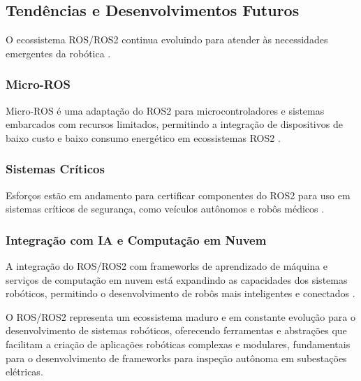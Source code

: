 \subsection{Tendências e Desenvolvimentos Futuros}

O ecossistema ROS/ROS2 continua evoluindo para atender às necessidades emergentes da robótica \cite{Macenski2022, ROS2Design2024}.

\subsubsection{Micro-ROS}

Micro-ROS é uma adaptação do ROS2 para microcontroladores e sistemas embarcados com recursos limitados, permitindo a integração de dispositivos de baixo custo e baixo consumo energético em ecossistemas ROS2 \cite{Macenski2022}.

\subsubsection{Sistemas Críticos}

Esforços estão em andamento para certificar componentes do ROS2 para uso em sistemas críticos de segurança, como veículos autônomos e robôs médicos \cite{Macenski2022, ROS2Design2024}.

\subsubsection{Integração com IA e Computação em Nuvem}

A integração do ROS/ROS2 com frameworks de aprendizado de máquina e serviços de computação em nuvem está expandindo as capacidades dos sistemas robóticos, permitindo o desenvolvimento de robôs mais inteligentes e conectados \cite{Macenski2022, ROS2Design2024}.

O ROS/ROS2 representa um ecossistema maduro e em constante evolução para o desenvolvimento de sistemas robóticos, oferecendo ferramentas e abstrações que facilitam a criação de aplicações robóticas complexas e modulares, fundamentais para o desenvolvimento de frameworks para inspeção autônoma em subestações elétricas.
